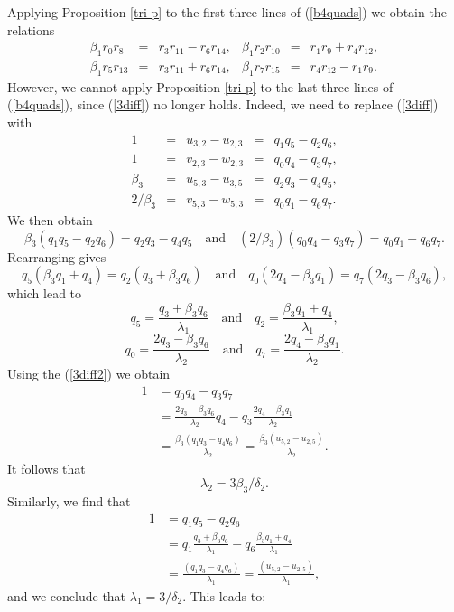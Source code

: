 \documentclass[letterpaper,10pt]{amsart}
\theoremstyle{definition}
\numberwithin{equation}{section}
\begin{document}
Applying Proposition \ref{tri-p} to the first three lines of (\ref{b4quads}) we obtain the relations 
\begin{equation} \label{B4qfir} \begin{matrix} \beta_1 r_0 r_8 & = & r_3 r_{11} - r_6 r_{14}, &\beta_1 r_2 r_{10} & = & r_1 r_9 + r_4 r_{12}, \\
\beta_1 r_5 r_{13} & = & r_3 r_{11} + r_6 r_{14}, & \beta_1 r_7 r_{15} & = & r_4 r_{12} - r_1 r_9. \end{matrix}
\end{equation}
However, we cannot apply Proposition \ref{tri-p} to the last three lines of (\ref{b4quads}), since (\ref{3diff}) no longer holds. Indeed, we need to replace (\ref{3diff}) with
\begin{equation} \label{3diff2} \begin{matrix} 
1 & = & u_{3,2} - u_{2,3} & = & q_1 q_5 - q_2 q_6, \\
1 & = & v_{2,3} - w_{2,3} & = & q_0 q_4 - q_3 q_7, \\
\beta_3 & = & u_{5,3} - u_{3,5} & = & q_2 q_3 - q_4 q_5, \\
2/\beta_3 & = & v_{5,3} - w_{5,3} & = & q_0 q_1 - q_6 q_7.
\end{matrix} 
\end{equation}
We then obtain 
\[\beta_3(q_1 q_5 - q_2 q_6) = q_2 q_3 - q_4 q_5 \quad \text{and} \quad (2/\beta_3) (q_0 q_4 - q_3 q_7) = q_0 q_1 - q_6 q_7.\]
Rearranging gives
\[q_5 (\beta_3 q_1 + q_4) = q_2 (q_3 + \beta_3 q_6) \quad \text{and} \quad q_0 (2 q_4 - \beta_3 q_1) = q_7 (2q_3 - \beta_3 q_6),\]
which lead to
\[q_5 = \frac{q_3 + \beta_3 q_6}{\lambda_1} \quad \text{and} \quad q_2 = \frac{\beta_3 q_1 + q_4}{\lambda_1},\]
\[q_0 = \frac{2 q_3 - \beta_3 q_6}{\lambda_2} \quad \text{and} \quad q_7 = \frac{2 q_4 - \beta_3 q_1}{\lambda_2}.\]
Using the (\ref{3diff2}) we obtain
\begin{align*} 1 & = q_0 q_4 - q_3 q_7 \\
& = \frac{2 q_3 - \beta_3 q_6}{\lambda_2} q_4 - q_3 \frac{2 q_4 - \beta_3 q_1}{\lambda_2} \\
& = \frac{\beta_3 (q_1 q_3 - q_4 q_6)}{\lambda_2} = \frac{\beta_3(u_{5,2} - u_{2,5})}{\lambda_2}.
\end{align*} 
It follows that 
\[\lambda_2 = 3\beta_3/\delta_2.\]
Similarly, we find that
\begin{align*} 1 & = q_1 q_5 - q_2 q_6 \\
& = q_1 \frac{q_3 + \beta_3 q_6}{\lambda_1} - q_6 \frac{\beta_3 q_1 + q_4}{\lambda_1} \\
& = \frac{(q_1 q_3 - q_4 q_6)}{\lambda_1} = \frac{(u_{5,2} - u_{2,5})}{\lambda_1},
\end{align*} 
and we conclude that $\lambda_1 = 3/\delta_2$. This leads to: 
\end{document}
